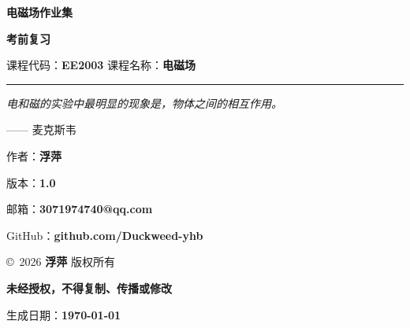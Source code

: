 \begin{titlepage}
    \centering
    \vspace*{2cm}
    
    {\Huge \bfseries 电磁场作业集 \par}
    \vspace{0.8cm}
    
    {\Large \bfseries 考前复习 \par}
    \vspace{0.4cm}
    {\Large 课程代码：\textbf{EE2003} \quad 课程名称：\textbf{电磁场} \par}
    \vspace{0.6cm}
    
    \rule{\linewidth}{0.2mm}
    \vspace{1cm}
    
    {\itshape \large 电和磁的实验中最明显的现象是，物体之间的相互作用。\par}
    \vspace{0.4cm}
    {\large —— 麦克斯韦 \par}
    \vspace{1.2cm}
    
    {\Large 作者：\textbf{浮萍} \par}
    \vspace{0.3cm}
    {\Large 版本：\textbf{1.0} \par}
    \vspace{0.3cm}
    {\Large 邮箱：\textbf{3071974740@qq.com} \par}
    \vspace{0.3cm}
    {\Large GitHub：\textbf{github.com/Duckweed-yhb} \par}
    \vspace{1cm}
    
    {\large \copyright\ 2026 \textbf{浮萍} 版权所有 \par}
    {\large \textbf{未经授权，不得复制、传播或修改} \par}
    \vspace{0.5cm}
    
    \vfill
    {\large 生成日期：\textbf{\today} \par}
\end{titlepage}

